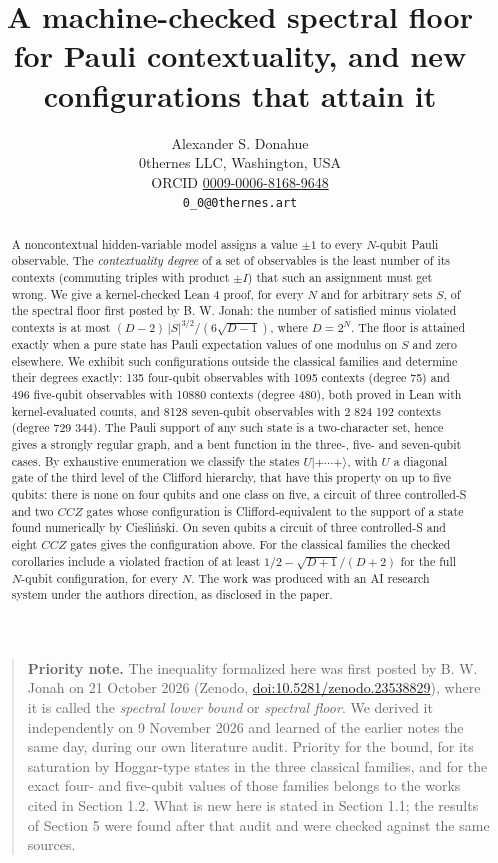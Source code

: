 \documentclass[11pt,a4paper]{article}
\title{A machine-checked spectral floor for Pauli contextuality, and new configurations that attain it}
\author{Alexander S. Donahue\\ 0thernes LLC, Washington, USA\\ ORCID \href{https://orcid.org/0009-0006-8168-9648}{0009-0006-8168-9648}\\ \texttt{0\_0@0thernes.art}}
\date{}
\begin{document}
\maketitle
\begin{quote}
\textbf{Priority note.} The inequality formalized here was first posted by B. W. Jonah on 21 October 2026
(Zenodo, \href{https://doi.org/10.5281/zenodo.23538829}{doi:10.5281/zenodo.23538829}), where it is called the
\emph{spectral lower bound} or \emph{spectral floor}. We derived it independently on 9 November 2026 and learned of the
earlier notes the same day, during our own literature audit. Priority for the bound, for its saturation
by Hoggar-type states in the three classical families, and for the exact four- and five-qubit values of
those families belongs to the works cited in Section 1.2. What is new here is stated in Section 1.1; the
results of Section 5 were found after that audit and were checked against the same sources.
\end{quote}

\begin{abstract}
A noncontextual hidden-variable model assigns a value \(\pm 1\) to every \(N\)-qubit Pauli observable. The
\emph{contextuality degree} of a set of observables is the least number of its contexts (commuting triples
with product \(\pm I\)) that such an assignment must get wrong. We give a kernel-checked Lean 4 proof, for
every \(N\) and for arbitrary sets \(S\), of the spectral floor first posted by B. W. Jonah:
the number of satisfied minus violated contexts is at most \((D-2)\,|S|^{3/2} / (6\sqrt{D-1})\), where
\(D = 2^N\). The floor is attained exactly when a pure state has Pauli expectation values of one modulus
on \(S\) and zero elsewhere. We exhibit such configurations outside the classical families and determine
their degrees exactly: 135 four-qubit observables with 1095 contexts (degree 75) and 496 five-qubit
observables with 10880 contexts (degree 480), both proved in Lean with kernel-evaluated counts, and 8128
seven-qubit observables with 2 824 192 contexts (degree 729 344). The Pauli support of any such state is
a two-character set, hence gives a strongly regular graph, and a bent function in the three-, five- and
seven-qubit cases. By exhaustive enumeration we classify the states \(U|{+}\cdots{+}\rangle\), with \(U\) a
diagonal gate of the third level of the Clifford hierarchy, that have this property on up to five
qubits: there is none on four qubits and one class on five, a circuit of three controlled-S and two
\(CCZ\) gates whose configuration is Clifford-equivalent to the support of a state found numerically by
Cieśliński. On seven qubits a circuit of three controlled-S and eight \(CCZ\) gates gives the configuration
above. For the classical families the checked corollaries include a violated fraction of at least
\(1/2 - \sqrt{D+1}/(D+2)\) for the full \(N\)-qubit configuration, for every \(N\). The work was produced with
an AI research system under the author\textquotesingle s direction, as disclosed in the paper.

\end{abstract}
\end{document}
